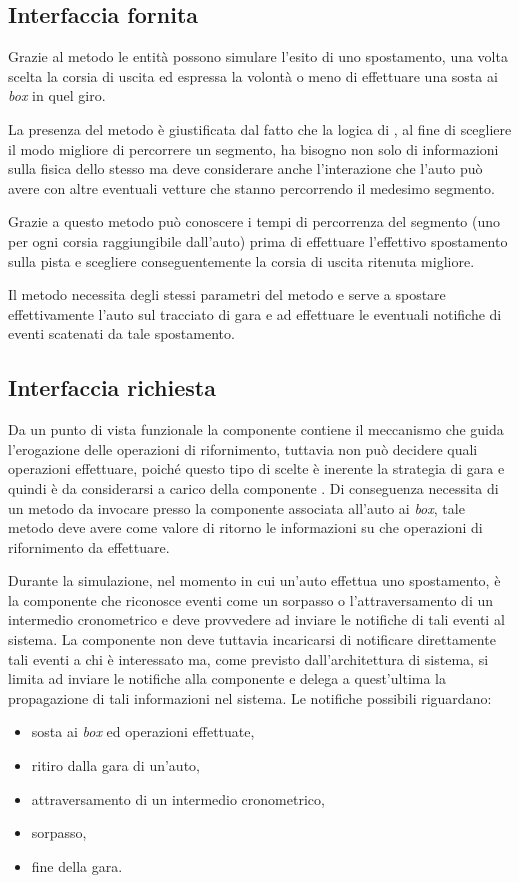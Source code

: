 \subsection*{Interfaccia fornita}
Grazie al metodo  le entità \car{} possono simulare l'esito di uno spostamento, una volta scelta la corsia di uscita ed espressa la volontà o meno di effettuare una sosta ai \textit{box} in quel giro.

La presenza del metodo  è giustificata dal fatto che la logica di \car{}, al fine di scegliere il modo migliore di percorrere un segmento, ha bisogno non solo di informazioni sulla fisica dello stesso ma deve considerare anche l'interazione che l'auto può avere con altre eventuali vetture che stanno percorrendo il medesimo segmento.

Grazie a questo metodo \car{} può conoscere i tempi di percorrenza del segmento (uno per ogni corsia raggiungibile dall'auto) prima di effettuare l'effettivo spostamento sulla pista e scegliere conseguentemente la corsia di uscita ritenuta migliore.

Il metodo  necessita degli stessi parametri del metodo  e serve a spostare effettivamente l'auto sul tracciato di gara e ad effettuare le eventuali notifiche di eventi scatenati da tale spostamento.

\subsection*{Interfaccia richiesta}
Da un punto di vista funzionale la componente \track{} contiene il meccanismo che guida l'erogazione delle operazioni di rifornimento, tuttavia non può decidere quali operazioni effettuare, poiché questo tipo di scelte è inerente la strategia di gara e quindi è da considerarsi a carico della componente \team{}. Di conseguenza \track{} necessita di un metodo  da invocare presso la componente \team{} associata all'auto ai \textit{box}, tale metodo deve avere come valore di ritorno le informazioni su che operazioni di rifornimento da effettuare.

Durante la simulazione, nel momento in cui un'auto effettua uno spostamento, è la componente \track{} che riconosce eventi come un sorpasso o l'attraversamento di un intermedio cronometrico e deve provvedere ad inviare le notifiche di tali eventi al sistema. La componente \track{} non deve tuttavia incaricarsi di notificare direttamente tali eventi a chi è interessato ma, come previsto dall'architettura di sistema, si limita ad inviare le notifiche alla componente \evdisp{} e delega a quest'ultima la propagazione di tali informazioni nel sistema.
Le notifiche possibili riguardano:
\begin{itemize}
\item sosta ai \textit{box} ed operazioni effettuate,
\item ritiro dalla gara di un'auto,
\item attraversamento di un intermedio cronometrico,
\item sorpasso,
\item fine della gara.
\end{itemize}

